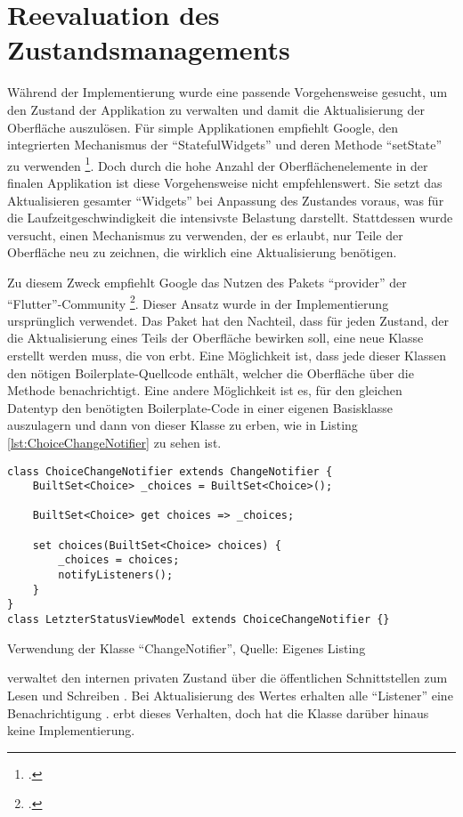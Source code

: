  
\section{Reevaluation des Zustandsmanagements}
\label{sec:Reevaluation-des-Zustandsmanagements}


Während der Implementierung wurde eine passende Vorgehensweise gesucht,
um den Zustand der Applikation zu verwalten
und damit die Aktualisierung der Oberfläche auszulösen.
Für simple Applikationen empfiehlt Google, den integrierten Mechanismus der \enquote{StatefulWidgets} und deren Methode \enquote{setState} zu verwenden \footcite[Vgl.][]{AddingInteractivityToYourFlutterApp}.
Doch durch die hohe Anzahl der Oberflächenelemente in der finalen Applikation ist diese Vorgehensweise nicht empfehlenswert.
Sie setzt das Aktualisieren gesamter \enquote{Widgets} bei Anpassung des Zustandes voraus,
was für die Laufzeitgeschwindigkeit die intensivste Belastung darstellt.
Stattdessen wurde versucht,
einen Mechanismus zu verwenden,
der es erlaubt,
nur Teile der Oberfläche neu zu zeichnen,
die wirklich eine Aktualisierung benötigen.

Zu diesem Zweck empfiehlt Google das Nutzen des Pakets \enquote{provider} der \enquote{Flutter}-Community \footcite[Vgl.][]{ProviderARecommendedApproach}.
Dieser Ansatz wurde in der Implementierung ursprünglich verwendet.
Das Paket hat den Nachteil,
dass für jeden Zustand,
der die Aktualisierung eines Teils der Oberfläche bewirken soll,
eine neue Klasse erstellt werden muss, die von  erbt.
Eine Möglichkeit ist,
dass jede dieser Klassen den nötigen Boilerplate-Quellcode enthält,
welcher die Oberfläche über die Methode  benachrichtigt.
Eine andere Möglichkeit ist es, für den gleichen Datentyp den benötigten Boilerplate-Code in einer eigenen Basisklasse auszulagern
und dann von dieser Klasse zu erben, wie in Listing \ref{lst:ChoiceChangeNotifier} zu sehen ist.
\ifIncludeFigures
  \begin{listing}[h]
    \begin{verbatim}
class ChoiceChangeNotifier extends ChangeNotifier {
    BuiltSet<Choice> _choices = BuiltSet<Choice>();

    BuiltSet<Choice> get choices => _choices;

    set choices(BuiltSet<Choice> choices) {
        _choices = choices;
        notifyListeners();
    }
}
class LetzterStatusViewModel extends ChoiceChangeNotifier {}
\end{verbatim}
    \caption[Verwendung der Klasse \enquote{ChangeNotifier}]{Verwendung der Klasse \enquote{ChangeNotifier}, Quelle: Eigenes Listing}
    \label{lst:ChoiceChangeNotifier}
  \end{listing}
\fi
{} verwaltet den internen privaten Zustand   über die öffentlichen Schnittstellen zum Lesen  und Schreiben .
Bei Aktualisierung des Wertes erhalten alle \enquote{Listener} eine Benachrichtigung .
 erbt dieses Verhalten, doch hat die Klasse darüber hinaus keine Implementierung.

